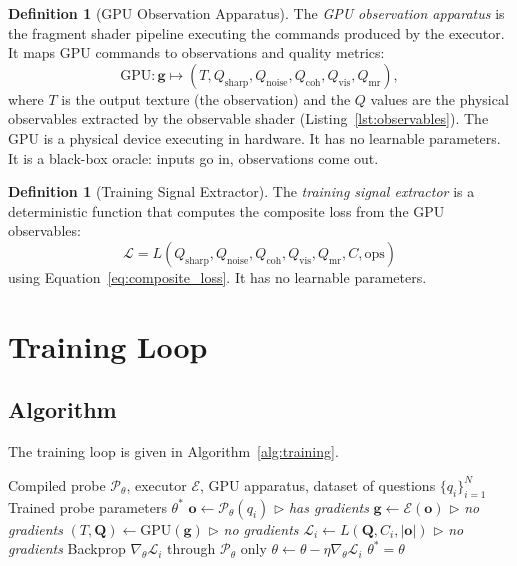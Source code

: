 \documentclass[11pt,twocolumn,a4paper]{article}
\theoremstyle{definition}
\newtheorem{definition}[theorem]{Definition}
\theoremstyle{remark}
\newcommand{\loss}{\mathcal{L}}
\newcommand{\params}{\theta}
\newcommand{\probe}{\mathcal{P}}
\newcommand{\engine}{\mathcal{E}}
\newcommand{\Qsharp}{Q_{\mathrm{sharp}}}
\newcommand{\Qnoise}{Q_{\mathrm{noise}}}
\newcommand{\Qcoh}{Q_{\mathrm{coh}}}
\newcommand{\Qvis}{Q_{\mathrm{vis}}}
\newcommand{\Qmr}{Q_{\mathrm{mr}}}
\begin{document}
\begin{definition}[GPU Observation Apparatus]
\label{def:gpu_apparatus}
The \emph{GPU observation apparatus} is the fragment shader pipeline executing the commands produced by the executor. It maps GPU commands to observations and quality metrics:
\[
\text{GPU}: \mathbf{g} \mapsto (T, \Qsharp, \Qnoise, \Qcoh, \Qvis, \Qmr),
\]
where $T$ is the output texture (the observation) and the $Q$ values are the physical observables extracted by the observable shader (Listing~\ref{lst:observables}). The GPU is a physical device executing in hardware. It has no learnable parameters. It is a black-box oracle: inputs go in, observations come out.
\end{definition}

\begin{definition}[Training Signal Extractor]
\label{def:signal_extractor}
The \emph{training signal extractor} is a deterministic function that computes the composite loss from the GPU observables:
\[
\loss = L(\Qsharp, \Qnoise, \Qcoh, \Qvis, \Qmr, C, \text{ops})
\]
using Equation~\ref{eq:composite_loss}. It has no learnable parameters.
\end{definition}


\section{Training Loop}
\label{sec:training_loop}

\subsection{Algorithm}

The training loop is given in Algorithm~\ref{alg:training}.

\begin{algorithm}[H]
\caption{Universal Training Loop}
\label{alg:training}
\begin{algorithmic}[1]
\REQUIRE Compiled probe $\probe_\params$, executor $\engine$, GPU apparatus, dataset of questions $\{q_i\}_{i=1}^N$
\ENSURE Trained probe parameters $\params^*$
        \STATE $\mathbf{o} \leftarrow \probe_\params(q_i)$ \hfill $\triangleright$ \textit{has gradients}
        \STATE $\mathbf{g} \leftarrow \engine(\mathbf{o})$ \hfill $\triangleright$ \textit{no gradients}
        \STATE $(T, \mathbf{Q}) \leftarrow \text{GPU}(\mathbf{g})$ \hfill $\triangleright$ \textit{no gradients}
        \STATE $\loss_i \leftarrow L(\mathbf{Q}, C_i, |\mathbf{o}|)$ \hfill $\triangleright$ \textit{no gradients}
        \STATE Backprop $\nabla_\params \loss_i$ through $\probe_\params$ only
        \STATE $\params \leftarrow \params - \eta \nabla_\params \loss_i$
    \ENDFOR
\ENDFOR
\RETURN $\params^* = \params$
\end{algorithmic}
\end{algorithm}
\end{document}

